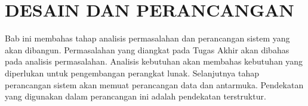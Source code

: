 \chapter{DESAIN DAN PERANCANGAN}
  Bab ini membahas tahap analisis permasalahan dan perancangan sistem yang akan dibangun. Permasalahan yang diangkat pada Tugas Akhir akan dibahas pada analisis permasalahan. Analisis kebutuhan akan membahas kebutuhan yang diperlukan untuk pengembangan perangkat lunak. Selanjutnya tahap perancangan sistem akan memuat perancangan data dan antarmuka. Pendekatan yang digunakan dalam perancangan ini adalah pendekatan terstruktur. 
  
  
  
  
  
  
  
  